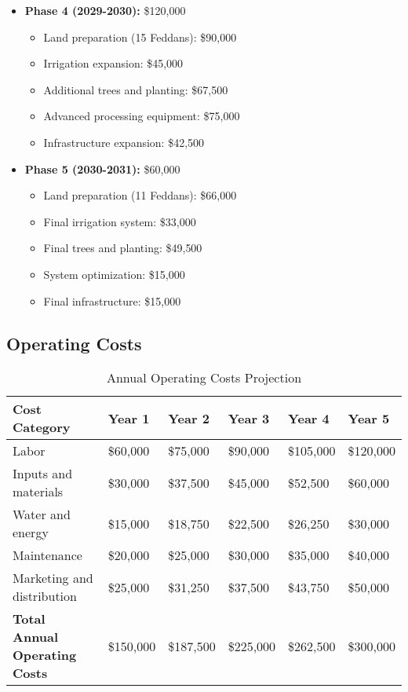 \begin{itemize}
    \item \textbf{Phase 4 (2029-2030):} \$120,000
    \begin{itemize}
        \item Land preparation (15 Feddans): \$90,000
        \item Irrigation expansion: \$45,000
        \item Additional trees and planting: \$67,500
        \item Advanced processing equipment: \$75,000
        \item Infrastructure expansion: \$42,500
    \end{itemize}
    
    \item \textbf{Phase 5 (2030-2031):} \$60,000
    \begin{itemize}
        \item Land preparation (11 Feddans): \$66,000
        \item Final irrigation system: \$33,000
        \item Final trees and planting: \$49,500
        \item System optimization: \$15,000
        \item Final infrastructure: \$15,000
    \end{itemize}
\end{itemize}

\subsection{Operating Costs}

\begin{table}[h]
\centering
\begin{tabular}{|p{3cm}|p{2cm}|p{2cm}|p{2cm}|p{2cm}|p{2cm}|}
\hline
\textbf{Cost Category} & \textbf{Year 1} & \textbf{Year 2} & \textbf{Year 3} & \textbf{Year 4} & \textbf{Year 5} \\
\hline
Labor & \$60,000 & \$75,000 & \$90,000 & \$105,000 & \$120,000 \\
Inputs and materials & \$30,000 & \$37,500 & \$45,000 & \$52,500 & \$60,000 \\
Water and energy & \$15,000 & \$18,750 & \$22,500 & \$26,250 & \$30,000 \\
Maintenance & \$20,000 & \$25,000 & \$30,000 & \$35,000 & \$40,000 \\
Marketing and distribution & \$25,000 & \$31,250 & \$37,500 & \$43,750 & \$50,000 \\
\hline
\textbf{Total Annual Operating Costs} & \$150,000 & \$187,500 & \$225,000 & \$262,500 & \$300,000 \\
\hline
\end{tabular}
\caption{Annual Operating Costs Projection}
\end{table}

